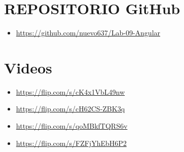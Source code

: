 \documentclass{article}
\begin{document}
	\clearpage




	\section{REPOSITORIO GitHub}

	\begin{itemize}
		\item \url{https://github.com/nuevo637/Lab-09-Angular}
	\end{itemize}
	
	\section{Videos}
	\begin{itemize}
		\item \url{https://flip.com/s/cK4x1VbL49nw}
		\item \url{https://flip.com/s/cH62CS-ZBK3q}
		\item \url{https://flip.com/s/qoMBkfTQRS6v}
		\item \url{https://flip.com/s/FZFjYhEbH6P2}
	\end{itemize}
\end{document}
